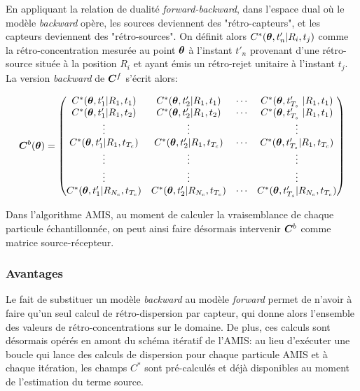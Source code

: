 En appliquant la relation de dualité \textit{forward-backward}, dans l'espace dual où le modèle \textit{backward} opère, les sources deviennent des "rétro-capteurs", et les capteurs deviennent des "rétro-sources". On définit alors $C^*({\bm{\theta}},t'_n | R_i, t_j)$ comme la rétro-concentration mesurée au point ${\bm{\theta}}$ à l'instant $t'_n$ provenant d'une rétro-source située à la position $R_i$ et ayant émis un rétro-rejet unitaire à l'instant $t_j$. La version \textit{backward} de ${\bm{C}}^f$ s'écrit alors:

\begin{equation}
\MatC^b (\VecTheta)= 
\begin{pmatrix}
	C^*(\VecTheta, t'_1 | R_1, t_1) & C^*(\VecTheta, t'_2 | R_1, t_1) & \cdots & C^*(\VecTheta, t'_{T_s} | R_1, t_1) \\
	C^*(\VecTheta, t'_1 | R_1, t_2) & C^*(\VecTheta, t'_2 | R_1, t_2) & \cdots & C^*(\VecTheta, t'_{T_s} | R_1, t_1) \\
	\vdots & \vdots & & \vdots \\
	C^*(\VecTheta, t'_1| R_1,t_{T_c}) & C^*(\VecTheta, t'_2 | R_1, t_{T_c}) & \cdots & C^*(\VecTheta, t'_{T_s} | R_1, t_{T_c}) \\ 
	\vdots & \vdots & & \vdots \\
	\vdots & \vdots & & \vdots \\
	C^*(\VecTheta, t'_1| R_{N_c},t_{T_c}) & C^*(\VecTheta, t'_2 | R_{N_c}, t_{T_c}) & \cdots & C^*(\VecTheta, t'_{T_s} | R_{N_c}, t_{T_c}) \\ 
	
\end{pmatrix}
\label{eq_matrix_backward}
\end{equation}

Dans l'algorithme AMIS, au moment de calculer la vraisemblance de chaque particule échantillonnée, on peut ainsi faire désormais intervenir ${\bm{C}}^b$ comme matrice source-récepteur.

\subsubsection{Avantages}

Le fait de substituer un modèle \textit{backward} au modèle \textit{forward} permet de n'avoir à faire qu'un seul calcul de rétro-dispersion par capteur, qui donne alors l'ensemble des valeurs de rétro-concentrations sur le domaine. De plus, ces calculs sont désormais opérés en amont du schéma itératif de l'AMIS: au lieu d'exécuter une boucle qui lance des calculs de dispersion pour chaque particule AMIS et à chaque itération, les champs $C^*$ sont pré-calculés et déjà disponibles au moment de l'estimation du terme source. \\

